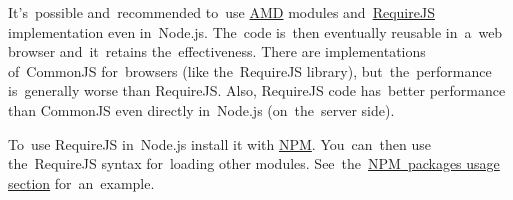 \note It's~possible and~recommended to~use \hyperref[amd]{AMD} modules and~\hyperref[requirejs]{RequireJS} implementation even in~Node.js.
The~code is~then eventually reusable in~a~web browser and~it~retains the~effectiveness.
There are implementations of~CommonJS for~browsers (like the~RequireJS library), but~the~performance is~generally worse than RequireJS\@.
Also, RequireJS code has~better performance than CommonJS even directly in~Node.js (on~the~server side).

To~use RequireJS in~Node.js install it with \hyperref[npm]{NPM}.
You~can~then use the~RequireJS syntax for~loading other modules.
See~the~\hyperref[npmpackageusage]{NPM~packages usage section} for~an~example.
